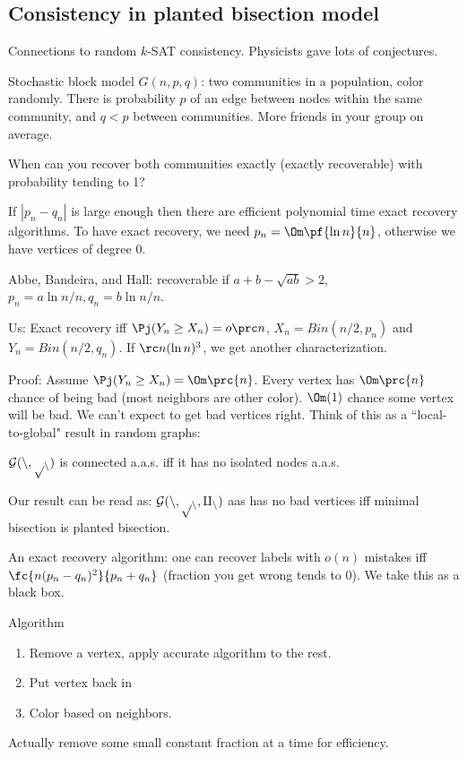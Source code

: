 \subsection{Consistency in planted bisection model}

Connections to random $k$-SAT consistency. Physicists gave lots of conjectures.

Stochastic block model $G(n,p,q)$: two communities in a population, color randomly. There is probability $p$ of an edge between nodes within the same community, and $q<p$ between communities. More friends in your group on average.



When can you recover both communities exactly (exactly recoverable) with probability tending to 1?

If $|p_n-q_n|$ is large enough then there are efficient polynomial time exact recovery algorithms. To have exact recovery, we need $p_n=\Om\pf{\ln n}{n}$, otherwise we have vertices of degree 0.

Abbe, Bandeira, and Hall: recoverable if $a+b-\sqrt{ab}>2$, $p_n=a\ln n/n,q_n=b\ln n/n$.

Us: Exact recovery iff $\Pj(Y_n\ge X_n)=o\prc n$, $X_n=Bin(n/2,p_n)$ and $Y_n=Bin(n/2,q_n)$.
If $\rc n(\ln n)^3$, we get another characterization. 

Proof: Assume $\Pj(Y_n\ge X_n)=\Om\prc{n}$. Every vertex has $\Om\prc{n}$ chance of being bad (most neighbors are other color). $\Om(1)$ chance some vertex will be bad. We can't expect to get bad vertices right. Think of this as a ``local-to-global" result in random graphs: 

\begin{thm}
$\cal G(n,p_n)$ is connected a.a.s. iff it has no isolated nodes a.a.s.
\end{thm}

Our result can be read as: $\cal G(n,p_n,q_n)$ aas has no bad vertices iff minimal bisection is planted bisection.

An exact recovery algorithm: one can recover labels with $o(n)$ mistakes iff $\fc{n(p_n-q_n)^2}{p_n+q_n}$ (fraction you get wrong tends to 0). We take this as a black box.

Algorithm
\begin{enumerate}
\item
Remove a vertex, apply accurate algorithm to the rest. 
\item 
Put vertex back in
\item
Color based on neighbors.
\end{enumerate}
Actually remove some small constant fraction at a time for efficiency.

